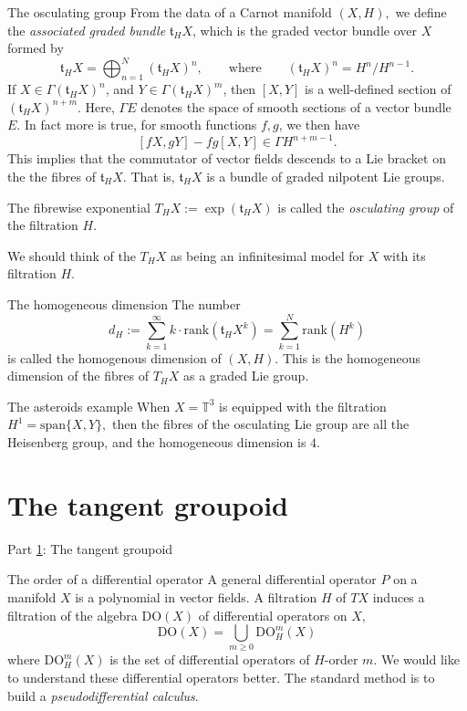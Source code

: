 \documentclass{beamer}
\numberwithin{equation}{section}
\theoremstyle{plain}
\theoremstyle{plain}
\theoremstyle{definition}
\theoremstyle{plain}
\theoremstyle{plain}
\theoremstyle{definition}
\newcommand{\Circ}{\mathbb{T}}
\newcommand{\tf}{\mathfrak{t}}
\begin{document}
\begin{frame}{The osculating group}
  From the data of a Carnot manifold $(X,H),$ we define the {\it associated graded bundle} $\mathfrak{t}_HX$, which is the graded vector bundle over $X$ formed by
  \[
      \mathfrak{t}_HX=\bigoplus_{n=1}^N (\mathfrak{t}_HX)^n,\qquad\text{where}\qquad (\mathfrak{t}_HX)^n=H^n/H^{n-1}.
  \]
  If $X\in\Gamma (\mathfrak{t}_HX)^n$, and $Y\in \Gamma(\mathfrak{t}_HX)^m$, then
  $[X,Y]$ is a well-defined section of $(\mathfrak{t}_HX)^{n+m}$. Here, $\Gamma E$ denotes the space of smooth sections of a vector bundle $E.$ In fact more is true, for smooth functions $f,g$, we then have
  \[
      [fX,gY]-fg[X,Y]\in\Gamma H^{n+m-1}.
  \]
  This implies that the commutator of vector fields descends to a Lie bracket on the the fibres of $\tf_HX.$ That is, $\tf_HX$ is a bundle of graded nilpotent Lie groups.

  The fibrewise exponential $T_HX := \exp(\tf_HX)$ is called the \emph{osculating group} of the filtration $H.$

  \pause
  We should think of the $T_HX$ as being an infinitesimal model for $X$ with its filtration $H.$
\end{frame}

\begin{frame}{The homogeneous dimension}
  The number
  \[
    d_H := \sum_{k=1}^\infty k\cdot \mathrm{rank}(\tf_HX^k) = \sum_{k=1}^N \mathrm{rank}(H^k)
  \]
  is called the homogenous dimension of $(X,H).$ This is the homogeneous dimension of the fibres of $T_HX$ as a graded Lie group.
\end{frame}


\begin{frame}{The asteroids example}
  When $X=  \Circ^3$ is equipped with the filtration $H^1 = \mathrm{span}\{X,Y\},$ then the fibres of the osculating Lie group are all the Heisenberg group, and the homogeneous dimension is $4.$

\end{frame}



\section{The tangent groupoid}\label{groupoid_section}
\begin{frame}
  \Huge{Part \ref{groupoid_section}: The tangent groupoid}
\end{frame}

\begin{frame}{The order of a differential operator}
  A general differential operator $P$ on a manifold $X$ is a polynomial in vector fields. A filtration $H$ of $TX$ induces a filtration of the algebra $\mathrm{DO}(X)$ of differential operators on $X,$
  \[
    \mathrm{DO}(X) = \bigcup_{m\geq 0} \mathrm{DO}_H^m(X)
  \]
  where $\mathrm{DO}_H^m(X)$ is the set of differential operators of $H$-order $m.$ We would like to understand these differential operators better. The standard method is to build a \emph{pseudodifferential calculus}.
\end{frame}
\end{document}
